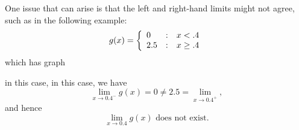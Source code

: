 \documentclass[10pt]{article}
\theoremstyle{definition}
\newcommand{\1}[1]{\textbf{1}_{\left[#1\right]}} %
\begin{document}
One issue that can arise is that the left and right-hand limits might not
agree, such as in the following example:
\begin{equation*}
  g(x) = \left\{ \begin{array}{l@{\quad:\quad}l} 0 & x< .4 \\2.5 &x \geq .4\end{array}\right.
\end{equation*}
which has graph
\begin{center}
\end{center}
in this case, in this case, we have
\begin{equation*}
  \lim_{x\to 0.4^{-}} g(x) = 0 \neq 2.5 = \lim_{x\to 0.4^{+}},
\end{equation*}
and hence
\begin{equation*}
  \lim_{x \to 0.4} g(x) \text{ does not exist.} 
\end{equation*}
\end{document}
